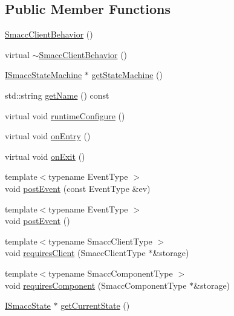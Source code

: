 \subsection*{Public Member Functions}
\begin{DoxyCompactItemize}
\item 
\hyperlink{classsmacc_1_1SmaccClientBehavior_a5fbea298db572d6c7558bfd1a65a942b}{Smacc\+Client\+Behavior} ()
\item 
virtual \hyperlink{classsmacc_1_1SmaccClientBehavior_a93dbf03b9c76a580c2de47d5bef7de0f}{$\sim$\+Smacc\+Client\+Behavior} ()
\item 
\hyperlink{classsmacc_1_1ISmaccStateMachine}{I\+Smacc\+State\+Machine} $\ast$ \hyperlink{classsmacc_1_1SmaccClientBehavior_aa817da149f366f6a28794c04eb0744b0}{get\+State\+Machine} ()
\item 
std\+::string \hyperlink{classsmacc_1_1SmaccClientBehavior_a3bdd13bc7822f75bdb64a1f23bcf9d6c}{get\+Name} () const 
\item 
virtual void \hyperlink{classsmacc_1_1SmaccClientBehavior_a228b90d814511a24907c5d65553bcba2}{runtime\+Configure} ()
\item 
virtual void \hyperlink{classsmacc_1_1SmaccClientBehavior_a7962382f93987c720ad432fef55b123f}{on\+Entry} ()
\item 
virtual void \hyperlink{classsmacc_1_1SmaccClientBehavior_ac0cd72d42bd00425362a97c9803ecce5}{on\+Exit} ()
\item 
{\footnotesize template$<$typename Event\+Type $>$ }\\void \hyperlink{classsmacc_1_1SmaccClientBehavior_ab29b23145ea074ad69340fc0af6fbb75}{post\+Event} (const Event\+Type \&ev)
\item 
{\footnotesize template$<$typename Event\+Type $>$ }\\void \hyperlink{classsmacc_1_1SmaccClientBehavior_a3152cd2215ebc0e387a8a546de07cded}{post\+Event} ()
\item 
{\footnotesize template$<$typename Smacc\+Client\+Type $>$ }\\void \hyperlink{classsmacc_1_1SmaccClientBehavior_a917f001e763a1059af337bf4e164f542}{requires\+Client} (Smacc\+Client\+Type $\ast$\&storage)
\item 
{\footnotesize template$<$typename Smacc\+Component\+Type $>$ }\\void \hyperlink{classsmacc_1_1SmaccClientBehavior_adee6abe3a28aa6b47d3dd5267e264b4d}{requires\+Component} (Smacc\+Component\+Type $\ast$\&storage)
\item 
\hyperlink{classsmacc_1_1ISmaccState}{I\+Smacc\+State} $\ast$ \hyperlink{classsmacc_1_1SmaccClientBehavior_abf6773e4dd948f932f11a346dd6e7c2c}{get\+Current\+State} ()
\end{DoxyCompactItemize}

